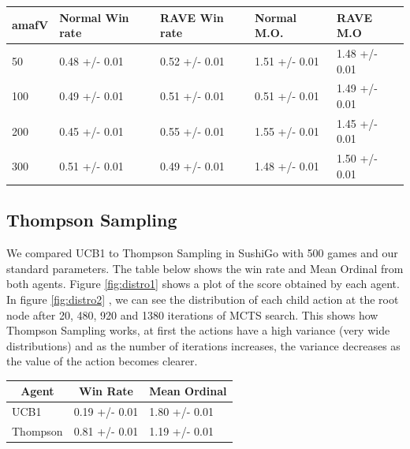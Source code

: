 \documentclass[conference]{IEEEtran}
\begin{document}
\begin{table}[H]
\begin{tabular}{|l|l|l|l|l|}
\hline
amafV & Normal Win rate & RAVE Win rate & Normal M.O.   & RAVE M.O      \\ \hline
50    & 0.48 +/- 0.01   & 0.52 +/- 0.01 & 1.51 +/- 0.01 & 1.48 +/- 0.01 \\ \hline
100   & 0.49 +/- 0.01   & 0.51 +/- 0.01 & 0.51 +/- 0.01 & 1.49 +/- 0.01 \\ \hline
200   & 0.45 +/- 0.01   & 0.55 +/- 0.01 & 1.55 +/- 0.01 & 1.45 +/- 0.01 \\ \hline
300   & 0.51 +/- 0.01   & 0.49 +/- 0.01 & 1.48 +/- 0.01 & 1.50 +/- 0.01 \\ \hline
\end{tabular}
\end{table}

\subsection{Thompson Sampling}
We compared UCB1 to Thompson Sampling in SushiGo with 500 games and our standard parameters. The table below shows the win rate and Mean Ordinal from both agents. Figure \ref{fig:distro1} shows a plot of the score obtained by each agent. In figure \ref{fig:distro2} , we can see the distribution of each child action at the root node after 20, 480, 920 and 1380 iterations of MCTS search. This shows how Thompson Sampling works, at first the actions have a high variance (very wide distributions) and as the number of iterations increases, the variance decreases as the value of the action becomes clearer.
\begin{table}[H]
\begin{tabular}{|l|l|l|}
\hline
\multicolumn{1}{|c|}{\textbf{Agent}} & \multicolumn{1}{c|}{\textbf{Win Rate}} & \multicolumn{1}{c|}{\textbf{Mean Ordinal}} \\ \hline
UCB1& 0.19 +/- 0.01 & 1.80 +/- 0.01\\ \hline
Thompson& 0.81 +/- 0.01& 1.19 +/- 0.01\\ \hline
\end{tabular}
\end{table}
\end{document}
